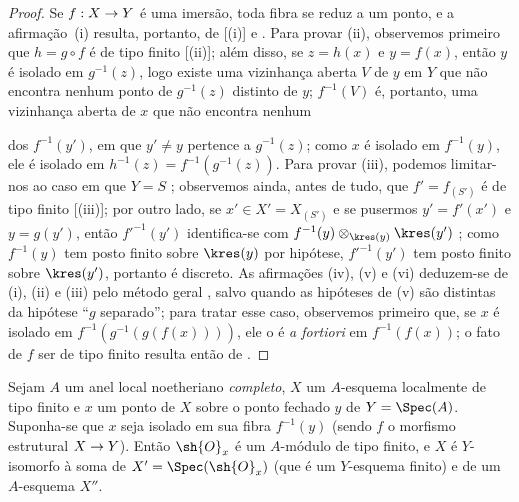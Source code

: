 \documentclass[oneside,10pt]{amsart}
\makeatletter
\newcommand{\ega@arrow}[2]{\mathchoice{#1}{#2}{#2}{#2}}
\renewcommand{\to}{\ega@arrow{\longrightarrow}{\rightarrow}}
\newcommand{\oldpage}[2][]{\marginnote{\normalfont\footnotesize\textbf{#1}~|~#2}\ignorespaces}
\let\EGAOriginalLabel\label
\renewcommand{\label}[1]{\phantomsection\EGAOriginalLabel{#1}}
\makeatother
\begin{document}
\begin{proof}
Se $f:X\to Y$ é uma imersão, toda fibra se reduz a um ponto, e a afirmação~(i) resulta, portanto, de [(i)] e .
Para provar (ii), observemos primeiro que $h=g\circ f$ é de tipo finito [(ii)];
além disso, se $z=h(x)$ e $y=f(x)$, então $y$ é isolado em $g^{-1}(z)$, logo existe uma vizinhança aberta $V$ de $y$ em $Y$ que não encontra nenhum ponto de $g^{-1}(z)$ distinto de $y$;
$f^{-1}(V)$ é, portanto, uma vizinhança aberta de $x$ que não encontra nenhum

\oldpage[II]{116}
dos $f^{-1}(y')$, em que $y'\neq y$ pertence a $g^{-1}(z)$;
como $x$ é isolado em $f^{-1}(y)$, ele é isolado em $h^{-1}(z)=f^{-1}(g^{-1}(z))$.
Para provar (iii), podemos limitar-nos ao caso em que $Y=S$ ;
observemos ainda, antes de tudo, que $f'=f_{(S')}$ é de tipo finito [(iii)];
por outro lado, se $x'\in X'=X_{(S')}$ e se pusermos $y'=f'(x')$ e $y=g(y')$, então ${f'}^{-1}(y')$ identifica-se com $f^{-1}(y)\otimes_{\kres(y)}\kres(y')$ ;
como $f^{-1}(y)$ tem posto finito sobre $\kres(y)$ por hipótese, ${f'}^{-1}(y')$ tem posto finito sobre $\kres(y')$, portanto é discreto.
As afirmações (iv), (v) e (vi) deduzem-se de (i), (ii) e (iii) pelo método geral , salvo quando as hipóteses de (v) são distintas da hipótese ``$g$ separado'';
para tratar esse caso, observemos primeiro que, se $x$ é isolado em $f^{-1}(g^{-1}(g(f(x))))$, ele o é \emph{a fortiori} em $f^{-1}(f(x))$;
o fato de $f$ ser de tipo finito resulta então de .
\end{proof}

\begin{proposition}[6.2.5]
\label{II.6.2.5}
Sejam $A$ um anel local noetheriano \emph{completo}, $X$ um $A$-esquema localmente de tipo finito e $x$ um ponto de $X$ sobre o ponto fechado $y$ de $Y=\Spec(A)$.
Suponha-se que $x$ seja isolado em sua fibra $f^{-1}(y)$ (sendo $f$ o morfismo estrutural $X\to Y$).
Então $\sh{O}_x$ é um $A$-módulo de tipo finito, e $X$ é $Y$-isomorfo à soma  de $X'=\Spec(\sh{O}_x)$ (que é um $Y$-esquema finito) e de um $A$-esquema $X''$.
\end{proposition}
\end{document}
